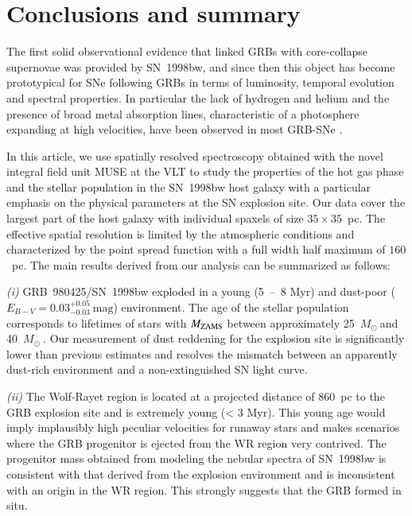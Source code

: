 \documentclass[traditabstract]{aa}
\newcommand{\Msun}{$M_\odot~$}
\begin{document}
\section{Conclusions and summary}

The first solid observational evidence that linked GRBs with core-collapse supernovae was provided by SN~1998bw, and since then this object has become prototypical for SNe following GRBs in terms of luminosity, temporal evolution and spectral properties. In particular the lack of hydrogen and helium and the presence of broad metal absorption lines, characteristic of a photosphere expanding at high velocities, have been observed in most GRB-SNe \citep{2012grbu.book..169H, 2016LPICo1962.4116C}. 

In this article, we use spatially resolved spectroscopy obtained with the novel integral field unit MUSE at the VLT to study the properties of the hot gas phase and the stellar population in the SN~1998bw host galaxy with a particular {emphasis} on the physical parameters at the SN explosion site. Our data cover the largest part of the host galaxy with individual spaxels of size $35 \times 35$~pc. The effective spatial resolution is limited by the atmospheric conditions and characterized by the point spread function with a full width half maximum of {$160$~pc}. The main results derived from our analysis can be summarized as follows:

\textit{(i)} GRB~980425/SN~1998bw exploded in a young (5~--~8 Myr) and dust-poor ($E_{B-V} = 0.03_{-0.03}^{+0.05}~\mathrm{mag}$) environment. The age of the stellar population corresponds to lifetimes of stars with $M_{\rm{ZAMS}}$  between approximately 25~\Msun and 40~\Msun. Our measurement of dust reddening for the explosion site is significantly lower than previous estimates and resolves the mismatch between an apparently dust-rich environment and a non-extinguished SN light curve.

\textit{(ii)} The Wolf-Rayet region is located at a projected distance of 860~pc to the GRB explosion site and is extremely young (< 3 Myr). This young age would imply implausibly high peculiar velocities for runaway stars and makes scenarios where the GRB progenitor is ejected from the WR region very contrived. The progenitor mass obtained from modeling the nebular spectra of SN~1998bw \citep{2006ApJ...640..854M} is consistent with that derived from the explosion environment and is inconsistent with an origin in the WR region. This strongly suggests that the GRB formed in situ.
\end{document}
